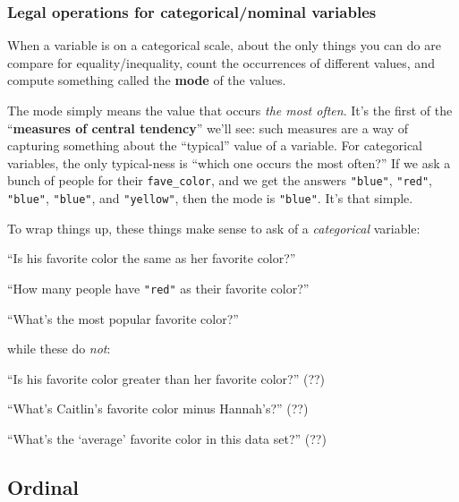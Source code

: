 \subsubsection{Legal operations for categorical/nominal variables}

When a variable is on a categorical scale, about the only things you can do are
compare for equality/inequality, count the occurrences of different values, and
compute something called the \textbf{mode} of the values.

\label{mode}
The mode simply means the value that occurs \textit{the most often}. It's the
first of the ``\textbf{measures of central tendency}'' we'll see: such measures
are a way of capturing something about the ``typical'' value of a variable. For
categorical variables, the only typical-ness is ``which one occurs the most
often?'' If we ask a bunch of people for their \texttt{fave\_color}, and we get
the answers \texttt{"blue"}, \texttt{"red"}, \texttt{"blue"}, \texttt{"blue"},
and \texttt{"yellow"}, then the mode is \texttt{"blue"}. It's that simple.

To wrap things up, these things make sense to ask of a \textit{categorical}
variable:

\begin{compactitem}
\item[\leftthumbsup] ``Is his favorite color the same as her favorite color?''
\item[\leftthumbsup] ``How many people have \texttt{"red"} as their favorite
color?''
\item[\leftthumbsup] ``What's the most popular favorite color?''
\end{compactitem}

while these do \textit{not}:

\begin{compactitem}
\item[\leftthumbsdown] ``Is his favorite color greater than her favorite
color?'' (??)
\item[\leftthumbsdown] ``What's Caitlin's favorite color minus Hannah's?'' (??)
\item[\leftthumbsdown] ``What's the `average' favorite color in this data
set?'' (??)
\end{compactitem}


\subsection{Ordinal}

